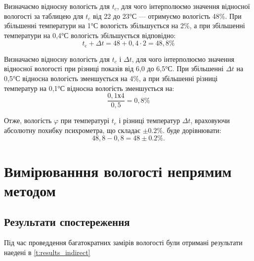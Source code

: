 Визначаємо відносну вологість для $t_c$, для чого інтерполюємо значення відносної вологості
за таблицею для $t_c$ від 22 до 23°С --- отримуємо вологість 48\%. При збільшенні температури на 1°С
вологість збільшується на 2\%, а при збільшенні температури на 0,4°С вологість збільшується
відповідно:
\begin{equation}
  t_{\text{c}} + \Delta t  =  48 +  0,4 \cdot 2 = 48,8\%
\end{equation}

Визначаємо відносну вологість для $t_c$ і $\Delta t$, для чого інтерполюємо значення відносної
вологості при різниці показів від 6,0 до 6,5°С. При збільшенні $\Delta t$ на 0,5°С відносна
вологість зменшується на 4\%, а при збільшенні різниці температур на 0,1°С відносна вологість
зменшується на:
\begin{equation}
  \frac{0,1х4}{0,5}=0,8\%
\end{equation}

Отже, вологість $\varphi$ при температурі $t_c$ і різниці температур $\Delta t$, враховуючи
абсолютну похибку психрометра, що складає $\pm 0.2\%$. буде дорівнювати:
\begin{equation}
  48,8 - 0,8 = 48 \pm 0.2\%.
\end{equation}

\section{Вимірюванння вологості непрямим методом}

\subsection{Результати спостереження}

Під час проведдення багатократних замірів вологості були отримані результати наедені в
\ref{t:results_indirect}

